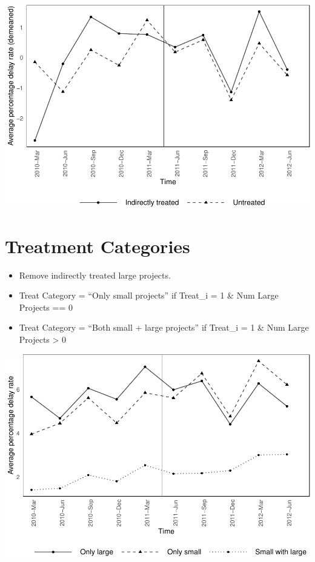 \documentclass[
]{article}
\providecommand{\tightlist}{%
  \setlength{\itemsep}{0pt}\setlength{\parskip}{0pt}}
\begin{document}
\includegraphics{parallel_trends_indirect_treat_files/figure-latex/demeaned_delay_plot-1.pdf}

\hypertarget{treatment-categories}{%
\section{Treatment Categories}\label{treatment-categories}}

\begin{itemize}
\tightlist
\item
  Remove indirectly treated large projects.
\item
  Treat Category = ``Only small projects'' if Treat\_i = 1 \& Num Large
  Projects == 0
\item
  Treat Category = ``Both small + large projects'' if Treat\_i = 1 \&
  Num Large Projects \textgreater{} 0
\end{itemize}

\includegraphics{parallel_trends_indirect_treat_files/figure-latex/delay_plot_treat_groups-1.pdf}
\end{document}
